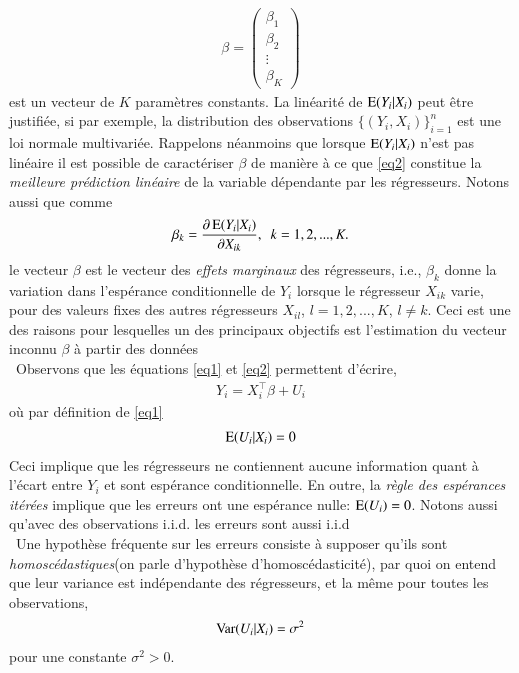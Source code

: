 \documentclass[10pt, reqno]{amsart}
\begin{document}
\begin{align*}
 \beta = 
 \begin{pmatrix}
 \beta_1\\
 \beta_2\\
 \vdots\\
 \beta_K
 \end{pmatrix}
\end{align*}
est un vecteur de $K$ paramètres constants. La linéarité de $\operatorname{E}(Y_i|X_i)$ peut être justifiée, si par exemple, la distribution des observations $\{(Y_i, X_i)\}_{i=1}^n$ est une loi normale multivariée. Rappelons néanmoins que lorsque $\operatorname{E}(Y_i|X_i)$ n'est pas linéaire il est possible de caractériser $\beta$ de manière à ce que \eqref{eq2} constitue la \emph{meilleure prédiction linéaire} de la variable dépendante par les régresseurs. Notons aussi que comme
\begin{align*}
\beta_k = \frac{\partial \Exp(Y_i|X_i)}{\partial X_{ik}}, \ \ k=1,2,...,K.
\end{align*}
le vecteur $\beta$ est le vecteur des \emph{effets marginaux} des régresseurs, i.e., $\beta_k$ donne la variation dans l'espérance  conditionnelle de $Y_i$ lorsque le régresseur $X_{ik}$ varie, pour des valeurs fixes des autres régresseurs $X_{il}$, $l=1,2,...,K$, $l\neq k$. Ceci est une des raisons pour lesquelles un des principaux objectifs est l'estimation du vecteur inconnu $\beta$ à partir des données\\\
Observons que les équations \eqref{eq1} et \eqref{eq2} permettent d'écrire,
\begin{align}
Y_i = X_i^\top\beta +U_i
\label{eq3}
\end{align}
où par définition de \eqref{eq1}
\begin{align}
\operatorname{E}(U_i|X_i) = 0
\label{eq4}
\end{align}
Ceci implique que les régresseurs ne contiennent aucune information quant à l'écart entre $Y_i$ et sont espérance conditionnelle. En outre, la \emph{règle des espérances itérées} implique que les erreurs ont une espérance nulle: $\operatorname{E}(U_i) = 0$. Notons aussi qu'avec des observations i.i.d. les erreurs sont aussi i.i.d\\\
Une hypothèse fréquente sur les erreurs consiste à supposer qu'ils sont \emph{homoscédastiques}(on parle d'hypothèse d'homoscédasticité), par quoi on entend que leur variance est indépendante des régresseurs, et la même pour toutes les observations,
\begin{align*}
\operatorname{Var}(U_i|X_i) = \sigma^2
\end{align*}
pour une constante $\sigma^2>0$.
\end{document}
